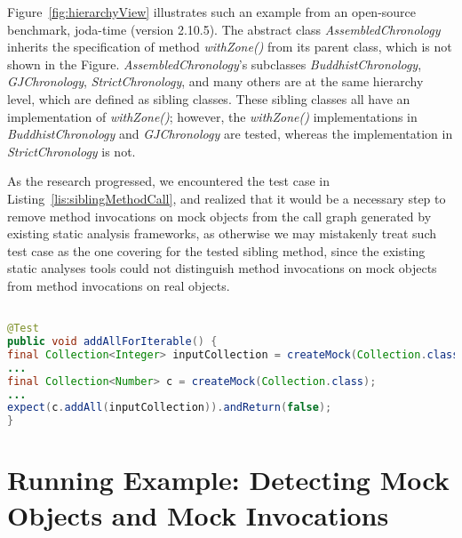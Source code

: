 Figure~\ref{fig:hierarchyView} illustrates such an example from an open-source benchmark, joda-time (version 2.10.5). The abstract class \textit{AssembledChronology} inherits the specification of method \textit{withZone()} from its parent class, which is not shown in the Figure. \textit{AssembledChronology}'s subclasses \textit{BuddhistChronology}, \textit{GJChronology}, \textit{StrictChronology}, and many others are at the same hierarchy level, which are defined as sibling classes. These sibling classes all have an implementation of \textit{withZone()}; however, the \textit{withZone()} implementations in \textit{BuddhistChronology} and \textit{GJChronology} are tested, whereas the implementation in \textit{StrictChronology} is not.

As the research progressed, we encountered the test case in Listing~\ref{lis:siblingMethodCall}, and realized that it would be a necessary step to remove method invocations on mock objects from the call graph generated by existing static analysis frameworks, as otherwise we may mistakenly treat such test case as the one covering for the tested sibling method, since the existing static analyses tools could not distinguish method invocations on mock objects from method invocations on real objects. 

\begin{lstlisting}[basicstyle=\ttfamily, caption={This code snippet illustrates an example from commons-collections4, where the method \textit{addAll()} invoked on the mock object \texttt{c} could be mistreated as a focal method being covered by existing static analysis frameworks.},
basicstyle=\ttfamily,language = Java, framesep=4.5mm, escapechar=|,
framexleftmargin=1.0mm, captionpos=b, label=lis:siblingMethodCall, morekeywords={@Test}]

@Test
public void addAllForIterable() {
final Collection<Integer> inputCollection = createMock(Collection.class);
...
final Collection<Number> c = createMock(Collection.class);
...
expect(c.addAll(inputCollection)).andReturn(false);
}
\end{lstlisting}

\section{Running Example: Detecting Mock Objects and Mock Invocations}
\label{sec:running-example}


